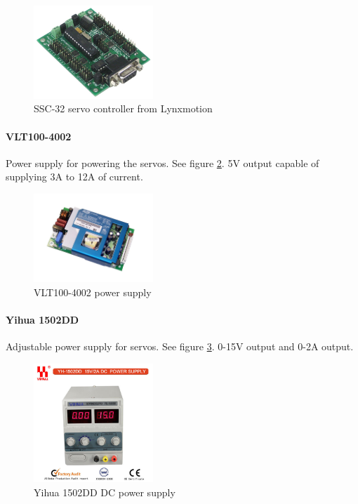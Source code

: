 \documentclass[titlepage,letterpaper,12pt]{article}
\begin{document}
\begin{figure}
  \centering
    \includegraphics[width=0.4\textwidth]{figures/lynxmotion-ssc-32-servo-controller-large.jpg}
  \caption{SSC-32 servo controller from Lynxmotion\protect\cite{sscfigcite}}
  \label{sscfig}
\end{figure}

\paragraph{VLT100-4002}Power supply for powering the servos. See figure
\ref{vltfig}. 5V output capable of supplying 3A to 12A of current\cite{vltdata}.

\begin{figure}
  \centering
    \includegraphics[width=0.4\textwidth]{figures/VLT100-4002.jpg}
  \caption{VLT100-4002 power supply\protect\cite{vltfigcite}}
  \label{vltfig}
\end{figure}

\paragraph{Yihua 1502DD}Adjustable power supply for servos. See figure
\ref{yihuafig}. 0-15V output and 0-2A output\cite{yihuadata}.

\begin{figure}
  \centering
    \includegraphics[width=0.4\textwidth]{figures/Power_Supply_YIHUA_1502DD.jpg}
  \caption{Yihua 1502DD DC power supply\protect\cite{yihuafigcite}}
  \label{yihuafig}
\end{figure}
\end{document}
